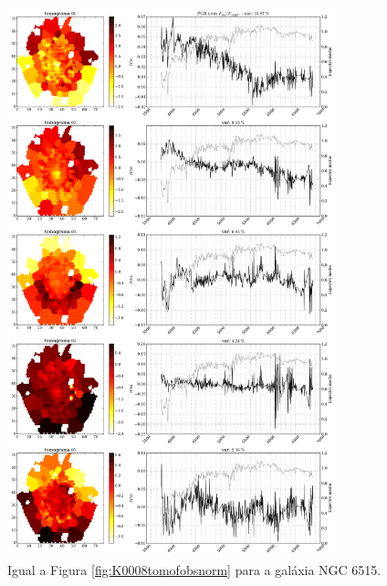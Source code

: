 \begin{figure}
    \includegraphics[width=0.85\textwidth]{figuras/K0864-tomo-obs-norm.pdf}
    \caption[Tomogramas de 1 a 5 para o cubo $F_{obs}$ norm. - NGC 6515.]
    {Igual a Figura \ref{fig:K0008tomofobsnorm} para a galáxia NGC 6515.}
    \label{fig:K0864tomofobsnorm}
\end{figure}

